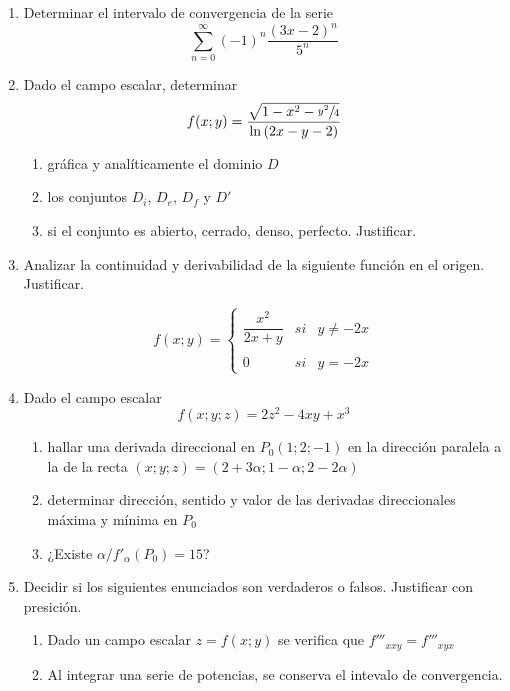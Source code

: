 \documentclass[9pt,a4paper]{extarticle}
\begin{document}
\begin{enumerate}
     \item Determinar el intervalo de convergencia de la serie 
     \[ \sum^\infty_{n=0} {(-1)}^n \dfrac{{(3x-2)}^n}{5^n}
     \]
    
    
    \item Dado el campo escalar, determinar
    \[
    f(x;y)= \dfrac{\sqrt{1-x^2-\sfrac{y^2}{4}}}{\ln{(2x-y-2)}}
    \]
    
    \begin{enumerate}
        \item gráfica y analíticamente el dominio $D$
        \item los conjuntos $D_i$, $D_e$, $D_f$ y $D'$
        \item si el conjunto es abierto, cerrado, denso, perfecto. Justificar.
    \end{enumerate}
    
    
    
    \item Analizar la continuidad y derivabilidad de la siguiente función en el origen. Justificar.
   
    \[
    f(x;y)= \left\{ \begin{array}{lcc}
             \dfrac{x^2}{2x + y} &   si  & y \neq -2x \\
             \\ 0 &  si & y = -2x
             \end{array}
   \right.
    \]
    
    \item Dado el campo escalar \[ f(x;y;z)=2z^2-4xy+x^3 \] 
    \begin{enumerate}
         \item hallar una derivada direccional en $P_0 (1;2;-1)$ en la dirección paralela a la de la recta $(x;y;z)=(2+3\alpha;1-\alpha;2-2\alpha)$
         \item determinar dirección, sentido y valor de las derivadas direccionales máxima y mínima en $P_0$
         \item ¿Existe $\alpha / {f'}_{\alpha}(P_0)=15$? 
    \end{enumerate}
    
    \item Decidir si los siguientes enunciados son verdaderos o falsos. Justificar con presición.
    \begin{enumerate}
         \item Dado un campo escalar $ z=f(x;y) $ se verifica que $ {f'''}_{xxy} = {f'''}_{xyx}$
         \item Al integrar una serie de potencias, se conserva el intevalo de convergencia.
    \end{enumerate}
\end{enumerate}
\end{document}
